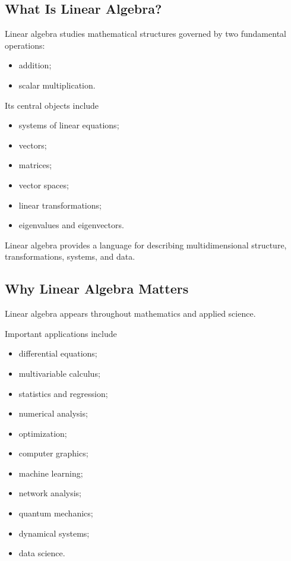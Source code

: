 \subsection{What Is Linear Algebra?}
\label{subsec:what-is-linear-algebra}

Linear algebra studies mathematical structures governed by two fundamental
operations:

\begin{itemize}
    \item addition;
    \item scalar multiplication.
\end{itemize}

Its central objects include

\begin{itemize}
    \item systems of linear equations;
    \item vectors;
    \item matrices;
    \item vector spaces;
    \item linear transformations;
    \item eigenvalues and eigenvectors.
\end{itemize}

\begin{conceptbox}
Linear algebra provides a language for describing multidimensional structure,
transformations, systems, and data.
\end{conceptbox}

\subsection{Why Linear Algebra Matters}
\label{subsec:why-linear-algebra-matters}

Linear algebra appears throughout mathematics and applied science.

Important applications include

\begin{itemize}
    \item differential equations;
    \item multivariable calculus;
    \item statistics and regression;
    \item numerical analysis;
    \item optimization;
    \item computer graphics;
    \item machine learning;
    \item network analysis;
    \item quantum mechanics;
    \item dynamical systems;
    \item data science.
\end{itemize}

